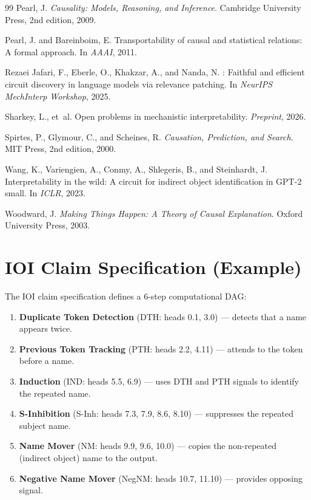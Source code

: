 \documentclass[10pt]{article}
\begin{document}
\begin{thebibliography}{99}
Pearl, J.
\newblock \emph{Causality: Models, Reasoning, and Inference}.
\newblock Cambridge University Press, 2nd edition, 2009.

Pearl, J. and Bareinboim, E.
\newblock Transportability of causal and statistical relations: A formal approach.
\newblock In \emph{AAAI}, 2011.

Rezaei Jafari, F., Eberle, O., Khakzar, A., and Nanda, N.
: Faithful and efficient circuit discovery in language models via relevance patching.
\newblock In \emph{NeurIPS MechInterp Workshop}, 2025.

Sharkey, L., et~al.
\newblock Open problems in mechanistic interpretability.
\newblock \emph{Preprint}, 2026.

Spirtes, P., Glymour, C., and Scheines, R.
\newblock \emph{Causation, Prediction, and Search}.
\newblock MIT Press, 2nd edition, 2000.

Wang, K., Variengien, A., Conmy, A., Shlegeris, B., and Steinhardt, J.
\newblock Interpretability in the wild: A circuit for indirect object identification in {GPT}-2 small.
\newblock In \emph{ICLR}, 2023.

Woodward, J.
\newblock \emph{Making Things Happen: A Theory of Causal Explanation}.
\newblock Oxford University Press, 2003.

\end{thebibliography}

\appendix

\section{IOI Claim Specification (Example)}
\label{app:ioi-spec}

The IOI claim specification defines a 6-step computational DAG:

\begin{enumerate}[nosep]
    \item \textbf{Duplicate Token Detection} (DTH: heads 0.1, 3.0) --- detects that a name appears twice.
    \item \textbf{Previous Token Tracking} (PTH: heads 2.2, 4.11) --- attends to the token before a name.
    \item \textbf{Induction} (IND: heads 5.5, 6.9) --- uses DTH and PTH signals to identify the repeated name.
    \item \textbf{S-Inhibition} (S-Inh: heads 7.3, 7.9, 8.6, 8.10) --- suppresses the repeated subject name.
    \item \textbf{Name Mover} (NM: heads 9.9, 9.6, 10.0) --- copies the non-repeated (indirect object) name to the output.
    \item \textbf{Negative Name Mover} (NegNM: heads 10.7, 11.10) --- provides opposing signal.
\end{enumerate}
\end{document}
